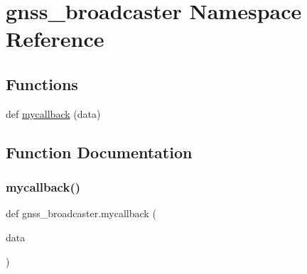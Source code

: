 \hypertarget{namespacegnss__broadcaster}{}\section{gnss\+\_\+broadcaster Namespace Reference}
\label{namespacegnss__broadcaster}
\subsection*{Functions}
\begin{DoxyCompactItemize}
\item 
def \hyperlink{namespacegnss__broadcaster_a0476bd17f38f4829ece1fde1e939ace2}{mycallback} (data)
\end{DoxyCompactItemize}


\subsection{Function Documentation}
\mbox{\label{namespacegnss__broadcaster_a0476bd17f38f4829ece1fde1e939ace2}} 
\subsubsection{\texorpdfstring{mycallback()}{mycallback()}}
{\footnotesize\ttfamily def gnss\+\_\+broadcaster.\+mycallback (\begin{DoxyParamCaption}\item[{}]{data }\end{DoxyParamCaption})}

